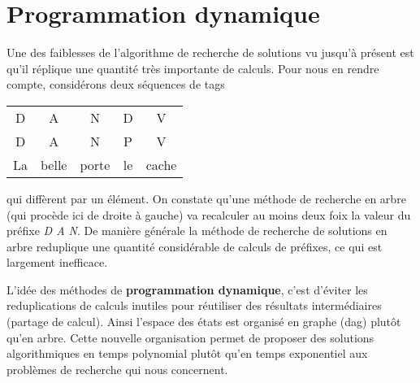 \documentclass[11pt,openany]{book}
\newcommand{\ac}[1]{{\sc #1}} %
\newcommand{\kw}[1]{{\bf #1}} %
\begin{document}
\section{Programmation dynamique}
\label{sec-DP}
Une des faiblesses de l'algorithme de recherche de solutions
vu jusqu'à présent est qu'il réplique une quantité très importante de calculs.
Pour nous en rendre compte, considérons deux séquences de tags 
\begin{center}
\begin{tabular}{ccccc}\toprule
D &A& N& D& V\\
D& A& N& P& V\\\midrule
La&belle&porte&le&cache\\\bottomrule
\end{tabular}
\end{center}
qui diffèrent par un élément.  On constate qu'une méthode de recherche en arbre (qui procède ici de droite à gauche)  va recalculer au moins deux foix la valeur du préfixe {\sl D A N}.  De manière générale la méthode de recherche de solutions en arbre reduplique une quantité considérable de calculs de préfixes, ce qui est largement inefficace.
\begin{center}
\end{center}
L'idée des méthodes de \kw{programmation dynamique}, c'est d'éviter les reduplications de calculs inutiles pour réutiliser des résultats intermédiaires (partage de calcul). Ainsi l'espace des états est organisé en  graphe (\ac{dag}) plutôt qu'en arbre. Cette nouvelle organisation permet de proposer des solutions algorithmiques en temps polynomial plutôt qu'en temps exponentiel aux problèmes de recherche qui nous concernent.
\end{document}
